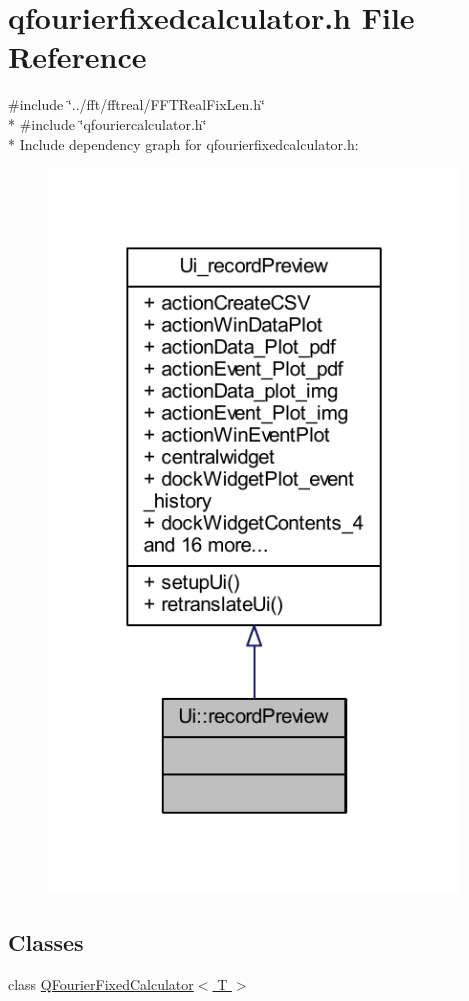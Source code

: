 \hypertarget{a00120}{\section{qfourierfixedcalculator.\+h File Reference}
\label{a00120}
}
{\ttfamily \#include \char`\"{}../fft/fftreal/\+F\+F\+T\+Real\+Fix\+Len.\+h\char`\"{}}\\*
{\ttfamily \#include \char`\"{}qfouriercalculator.\+h\char`\"{}}\\*
Include dependency graph for qfourierfixedcalculator.\+h\+:
\nopagebreak
\begin{figure}[H]
\begin{center}
\leavevmode
\includegraphics[width=310pt]{dd/d4e/a00329}
\end{center}
\end{figure}
\subsection*{Classes}
\begin{DoxyCompactItemize}
\item 
class \hyperlink{a00053}{Q\+Fourier\+Fixed\+Calculator$<$ T $>$}
\end{DoxyCompactItemize}

